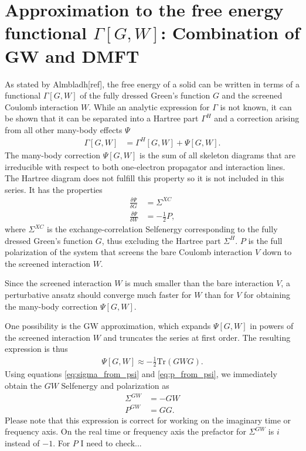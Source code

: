 \documentclass[12pt,a4paper]{scrartcl}
\numberwithin{equation}{section}
\newcommand{\cng}[1]{{\color{red}#1}}
\begin{document}
\section{Approximation to the free energy functional $\Gamma[G,W]$: Combination of GW and DMFT}
As stated by Almbladh[ref], the free energy of a solid can be written in terms of
a functional $\Gamma[G,W]$ of the fully dressed Green's function $G$
and the screened Coulomb interaction $W$. While an analytic expression for 
$\Gamma$ is not known, it can be shown that it can be separated into 
a Hartree part $\Gamma^H$ and a correction arising from all other many-body effects
$\Psi$
\begin{align}
\Gamma[G,W] &= \Gamma^H[G,W] + \Psi[G,W].
\end{align}
The many-body correction $\Psi[G,W]$ is the sum of all skeleton diagrams that are
irreducible with respect to both one-electron propagator and
interaction lines. The Hartree diagram does not fulfill
this property so it is not included in this series. 
It has the properties
\begin{align}
\frac{\delta \Psi}{\delta G} &= \Sigma^{XC}  \label{eq:sigma_from_psi} \\
\frac{\delta \Psi}{\delta W} &= -\frac{1}{2}P \label{eq:p_from_psi},
\end{align}
where $\Sigma^{XC}$ is the exchange-correlation Selfenergy corresponding to the
fully dressed Green's function $G$, thus excluding the Hartree part $\Sigma^H$.
$P$ is the full polarization of the system that screens the bare Coulomb
interaction $V$ down to the screened interaction $W$.

Since the screened interaction $W$ is much smaller than the bare interaction
$V$, a perturbative ansatz should converge much faster
for $W$ than for $V$ for obtaining the many-body correction $\Psi[G,W]$.

One possibility is the GW approximation, which expands $\Psi[G,W]$ in powers of the
screened interaction $W$ and truncates the series at first order. The resulting expression
is thus
\begin{align}
\Psi[G,W] \approx -\frac{1}{2} \mathrm{Tr}(GWG).
\end{align}
Using equations \eqref{eq:sigma_from_psi} and \eqref{eq:p_from_psi},
we immediately obtain the $GW$ Selfenergy and polarization as
\begin{align}
\Sigma^{GW} &= -GW \\
P^{GW} &= GG.
\end{align}
Please note that this expression is correct for working on the imaginary
time or frequency axis. On the real time or frequency axis  the prefactor 
for $\Sigma^{GW}$ is $i$ instead of $-1$. \cng{For $P$ I need to check...}
\end{document}
